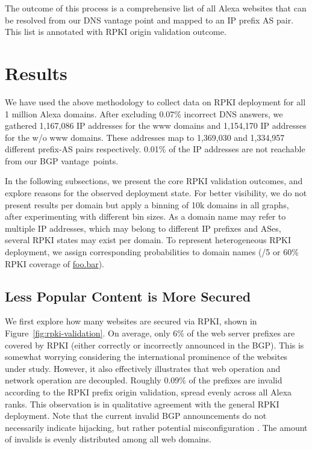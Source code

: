 The outcome of this process is a comprehensive list of all Alexa websites that \one can be resolved from our DNS vantage point and \two mapped to an IP prefix AS pair.
This list is \three annotated with RPKI origin validation outcome.






\section{Results}
\label{sec:results}


We have used the above methodology to collect data on RPKI deployment for all 1 million Alexa domains.
After excluding 0.07\% incorrect DNS answers, we gathered 1,167,086 IP addresses
for the www domains and 1,154,170 IP addresses for the w/o www domains.
These addresses map to 1,369,030 and 1,334,957 different prefix-AS
pairs respectively. 0.01\% of the IP addresses are not reachable from our
BGP vantage~points.

In the following subsections, we present the core RPKI
validation outcomes, and explore reasons for the observed deployment
state. For better visibility, we do not present results per domain but
apply a binning of 10k domains in all graphs, after experimenting with different bin sizes. As a domain name may refer to multiple IP
addresses, which may belong to different IP prefixes and ASes, several RPKI
states may exist per domain. To represent heterogeneous RPKI deployment, we assign corresponding probabilities to domain names (/5 or 60\% RPKI coverage of \url{foo.bar}).




\subsection{Less Popular Content is More Secured}

We first explore how many websites are secured via RPKI, shown in Figure~\ref{fig:rpki-validation}.
On average, only 6\% of the web server prefixes are covered by RPKI (either
correctly or incorrectly announced in the BGP). This is somewhat worrying considering the international prominence
of the websites under study.
However, it also effectively illustrates that web operation and network operation are decoupled.
Roughly 0.09\% of the
prefixes are invalid according to the RPKI prefix origin validation, spread evenly across all Alexa ranks. This
observation is in qualitative agreement with the general RPKI deployment. Note
that the current invalid BGP announcements do not necessarily indicate
hijacking, but rather potential misconfiguration \cite{wms-tdbrh-12}. The amount of
invalids is evenly distributed among all web domains.


